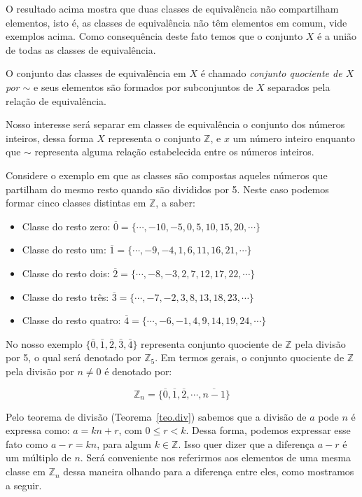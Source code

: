 	O resultado acima mostra que duas classes de equival\^{e}ncia n\~{a}o compartilham elementos, isto \'{e}, as classes de equival\^{e}ncia
	n\~{a}o t\^{e}m elementos em comum, vide exemplos acima. Como consequ\^{e}ncia deste fato temos que o conjunto $X$ \'{e} a 
	uni\~{a}o de todas as classes de equival\^{e}ncia. 
	
	O conjunto das classes de equival\^{e}ncia em $X$ \'{e} chamado \textit{conjunto quociente de $X$ por $\sim$} e 
	seus elementos s\~{a}o formados por subconjuntos de $X$ separados pela rela\c{c}\~{a}o de equival\^{e}ncia.
	
	Nosso interesse ser\'{a} separar em classes de equival\^{e}ncia o conjunto dos n\'{u}meros inteiros, dessa forma $X$ representa
	o conjunto $\mathbb{Z}$, e $x$ um n\'{u}mero inteiro enquanto que
	$\sim$ representa alguma rela\c{c}\~{a}o estabelecida entre os n\'{u}meros inteiros. 
	
	Considere o exemplo em que as classes s\~{a}o compostas aqueles n\'{u}meros que partilham do mesmo resto quando s\~{a}o divididos por 
	5. Neste caso podemos formar cinco classes distintas em $\mathbb{Z}$, a saber:
	\begin{itemize}
		\item Classe do resto zero: $\overline{0}=\{\cdots, -10, -5, 0, 5, 10, 15, 20, \cdots\}$
		\item Classe do resto um: $\overline{1}=\{\cdots, -9, -4, 1, 6, 11, 16, 21, \cdots\}$
		\item Classe do resto dois: $\overline{2}=\{\cdots, -8, -3, 2, 7, 12, 17, 22, \cdots\}$
		\item Classe do resto tr\^{e}s: $\overline{3}=\{\cdots, -7, -2, 3, 8, 13, 18, 23, \cdots\}$
		\item Classe do resto quatro: $\overline{4}=\{\cdots, -6, -1, 4, 9, 14, 19, 24, \cdots\}$
	\end{itemize}

	
	No nosso exemplo $\{\bar{0}, \bar{1}, \bar{2}, \bar{3}, \bar{4}\}$ representa conjunto quociente 
	de $\mathbb{Z}$ pela divis\~{a}o por 5, o qual ser\'{a} denotado por $\mathbb{Z}_{5}$. Em termos gerais, 
	o conjunto quociente de $\mathbb{Z}$ pela divis\~{a}o por $n\neq 0$ \'{e} denotado por:

	$$\mathbb{Z}_{n}=\{\overline{0}, \overline{1}, \overline{2}, \cdots, \overline{n-1}\}$$ 

Pelo teorema de divis\~{a}o (Teorema~\ref{teo.div}) sabemos que a divis\~{a}o de $a$ pode $n$ \'{e} expressa como:
$a=kn+r$, com $0\leq r< k$. Dessa forma, podemos expressar esse fato como $a-r=kn$, para algum $k\in\mathbb{Z}$. Isso 
quer dizer que a diferen\c{c}a $a-r$ \'{e} um m\'{u}ltiplo de $n$. Ser\'{a} conveniente nos referirmos aos elementos 
de uma mesma classe em $\mathbb{Z}_{n}$ dessa maneira olhando para a diferen\c{c}a entre eles, como mostramos a seguir. 
   
